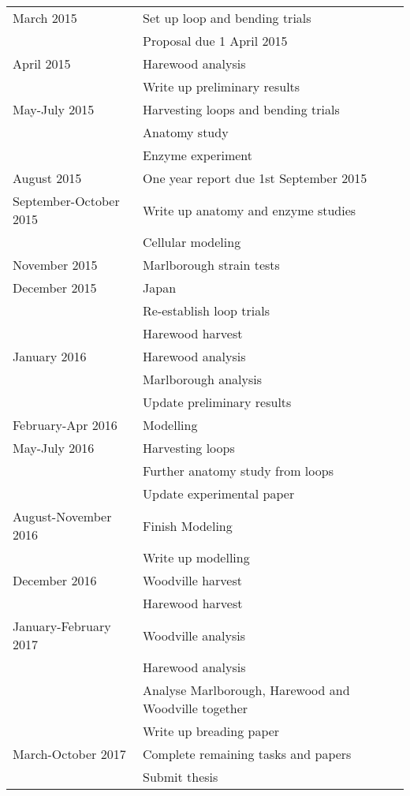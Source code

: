 \documentclass{article}
\begin{document}
\begin{tabular}{ l l }
\hline
  March 2015 & Set up loop and bending trials \\
   & Proposal due 1 April 2015 \\
   \hline
  April 2015 & Harewood analysis \\
  & Write up preliminary results \\
  \hline
  May-July 2015 & Harvesting loops and bending trials \\
  & Anatomy study\\
  & Enzyme experiment\\
  \hline
  August 2015 & One year report due 1st September 2015\\
  \hline
  September-October 2015&Write up anatomy and enzyme studies\\
  &Cellular modeling\\
  \hline
  November 2015&Marlborough strain tests\\
  \hline
  December 2015 & Japan \\
  &Re-establish loop trials\\
  & Harewood harvest\\
  \hline
  January 2016&Harewood analysis\\
  &Marlborough analysis\\
  & Update preliminary results \\
  \hline
  February-Apr 2016 & Modelling\\
  \hline
  May-July 2016&Harvesting loops\\
  &Further anatomy study from loops\\
  &Update experimental paper\\
  \hline
  August-November 2016&Finish Modeling\\
  &Write up modelling\\
  \hline
  December 2016&Woodville harvest\\
  &Harewood harvest\\
  \hline
  January-February 2017&Woodville analysis\\
  &Harewood analysis\\
  &Analyse Marlborough, Harewood and Woodville together\\
  &Write up breading paper\\
  \hline
  March-October 2017&Complete remaining tasks and papers\\
  &Submit thesis\\
  \hline
\end{tabular}
\doublespacing
\end{document}
